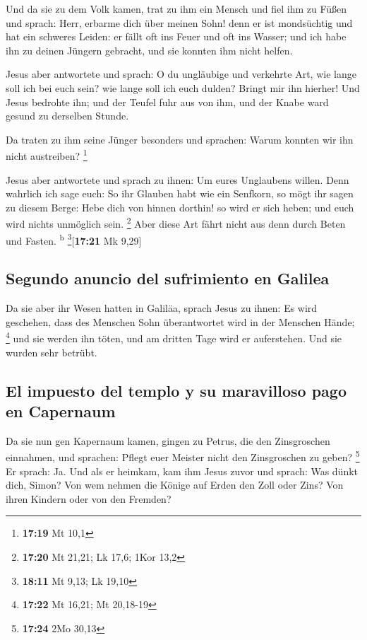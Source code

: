  Und da sie zu dem Volk kamen, trat zu ihm ein Mensch und
fiel ihm zu Füßen  und sprach: Herr, erbarme dich über
meinen Sohn! denn er ist mondsüchtig und hat ein schweres Leiden: er
fällt oft ins Feuer und oft ins Wasser;  und ich habe ihn
zu deinen Jüngern gebracht, und sie konnten ihm nicht helfen.

 Jesus aber antwortete und sprach: O du ungläubige und
verkehrte Art, wie lange soll ich bei euch sein? wie lange soll ich euch
dulden? Bringt mir ihn hierher!  Und Jesus bedrohte ihn;
und der Teufel fuhr aus von ihm, und der Knabe ward gesund zu derselben
Stunde.

 Da traten zu ihm seine Jünger besonders und sprachen:
Warum konnten wir ihn nicht austreiben? \footnote{\textbf{17:19} Mt 10,1}

 Jesus aber antwortete und sprach zu ihnen: Um eures
Unglaubens willen. Denn wahrlich ich sage euch: So ihr Glauben habt wie
ein Senfkorn, so mögt ihr sagen zu diesem Berge: Hebe dich von hinnen
dorthin! so wird er sich heben; und euch wird nichts unmöglich sein.
\footnote{\textbf{17:20} Mt 21,21; Lk 17,6; 1Kor 13,2} 
Aber diese Art fährt nicht aus denn durch Beten und Fasten.
\textsuperscript{b} \footnote{\textbf{18:11} Mt 9,13; Lk 19,10}{[}\textbf{17:21}
Mk 9,29{]}

\hypertarget{segundo-anuncio-del-sufrimiento-en-galilea}{%
\subsection{Segundo anuncio del sufrimiento en
Galilea}\label{segundo-anuncio-del-sufrimiento-en-galilea}}

 Da sie aber ihr Wesen hatten in Galiläa, sprach Jesus zu
ihnen: Es wird geschehen, dass des Menschen Sohn überantwortet wird in
der Menschen Hände; \footnote{\textbf{17:22} Mt 16,21; Mt 20,18-19}
 und sie werden ihn töten, und am dritten Tage wird er
auferstehen. Und sie wurden sehr betrübt.

\hypertarget{el-impuesto-del-templo-y-su-maravilloso-pago-en-capernaum}{%
\subsection{El impuesto del templo y su maravilloso pago en
Capernaum}\label{el-impuesto-del-templo-y-su-maravilloso-pago-en-capernaum}}

 Da sie nun gen Kapernaum kamen, gingen zu Petrus, die
den Zinsgroschen einnahmen, und sprachen: Pflegt euer Meister nicht den
Zinsgroschen zu geben? \footnote{\textbf{17:24} 2Mo 30,13}
 Er sprach: Ja. Und als er heimkam, kam ihm Jesus zuvor
und sprach: Was dünkt dich, Simon? Von wem nehmen die Könige auf Erden
den Zoll oder Zins? Von ihren Kindern oder von den Fremden?

